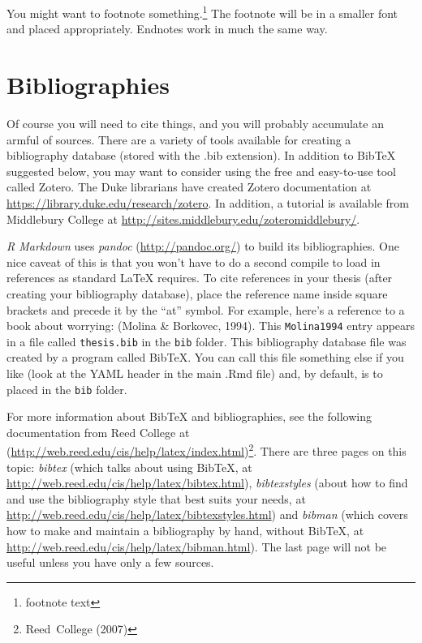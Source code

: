 \documentclass[12pt,twoside]{dukestatscithesis}
\theoremstyle{definition}
\theoremstyle{definition}
\theoremstyle{definition}
\theoremstyle{remark}
\begin{document}
You might want to footnote something.\footnote{footnote text} The
footnote will be in a smaller font and placed appropriately. Endnotes
work in much the same way.

\section{Bibliographies}\label{bibliographies}

Of course you will need to cite things, and you will probably accumulate
an armful of sources. There are a variety of tools available for
creating a bibliography database (stored with the .bib extension). In
addition to BibTeX suggested below, you may want to consider using the
free and easy-to-use tool called Zotero. The Duke librarians have
created Zotero documentation at
\url{https://library.duke.edu/research/zotero}. In addition, a tutorial
is available from Middlebury College at
\url{http://sites.middlebury.edu/zoteromiddlebury/}.

\emph{R Markdown} uses \emph{pandoc} (\url{http://pandoc.org/}) to build
its bibliographies. One nice caveat of this is that you won't have to do
a second compile to load in references as standard LaTeX requires. To
cite references in your thesis (after creating your bibliography
database), place the reference name inside square brackets and precede
it by the ``at'' symbol. For example, here's a reference to a book about
worrying: (Molina \& Borkovec, 1994). This \texttt{Molina1994} entry
appears in a file called \texttt{thesis.bib} in the \texttt{bib} folder.
This bibliography database file was created by a program called BibTeX.
You can call this file something else if you like (look at the YAML
header in the main .Rmd file) and, by default, is to placed in the
\texttt{bib} folder.

For more information about BibTeX and bibliographies, see the following
documentation from Reed College at
(\url{http://web.reed.edu/cis/help/latex/index.html})\footnote{Reed~College
  (2007)}. There are three pages on this topic: \emph{bibtex} (which
talks about using BibTeX, at
\url{http://web.reed.edu/cis/help/latex/bibtex.html}),
\emph{bibtexstyles} (about how to find and use the bibliography style
that best suits your needs, at
\url{http://web.reed.edu/cis/help/latex/bibtexstyles.html}) and
\emph{bibman} (which covers how to make and maintain a bibliography by
hand, without BibTeX, at
\url{http://web.reed.edu/cis/help/latex/bibman.html}). The last page
will not be useful unless you have only a few sources.
\end{document}
